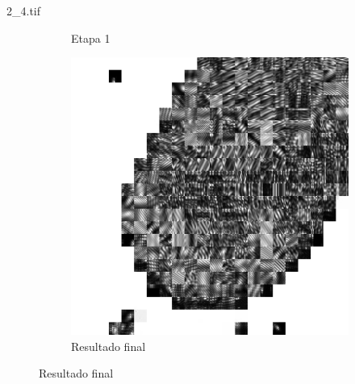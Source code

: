 \documentclass{beamer}
\begin{document}
\begin{frame}{2\_4.tif}
\begin{figure}
\begin{subfigure}[!ht]{0.32\textwidth}
                \caption{Etapa 1}
            \end{subfigure}
            \begin{subfigure}[!ht]{0.32\textwidth}
                \includegraphics[width=\columnwidth]{Fingerprints/2_4_final.jpg}
                \caption{Resultado final}
            \end{subfigure}
        \end{figure}
    \end{frame}
\end{document}
